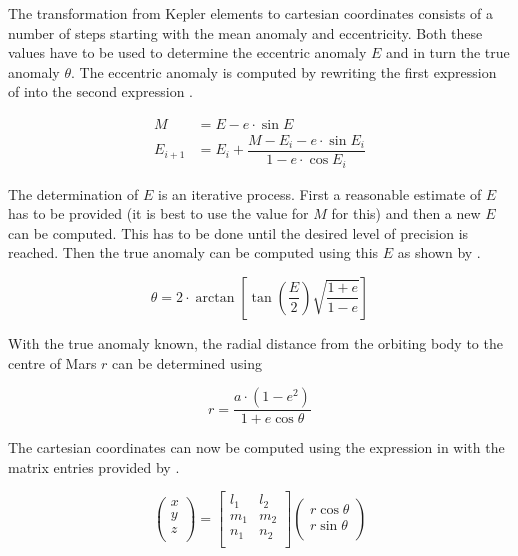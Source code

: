 \noindent
The transformation from Kepler elements to cartesian coordinates consists of a number of steps starting with the mean anomaly and eccentricity. Both these values have to be used to determine the eccentric anomaly $E$ and in turn the true anomaly $\theta$. The eccentric anomaly is computed by rewriting the first expression of  into the second expression \citep{noomen2013basic}. 



\begin{equation}\label{eq:mandecomp}
\begin{split}
 M&=E-e\cdot\sin{E}\\
 E_{i+1}&=E_{i}+\dfrac{M-E_{i}-e\cdot\sin{E_{i}}}{1-e\cdot\cos E_{i}}
\end{split}
\end{equation}

\noindent
The determination of $E$ is an iterative process. First a reasonable estimate of $E$ has to be provided (it is best to use the value for $M$ for this) and then a new $E$ can be computed. This has to be done until the desired level of precision is reached. Then the true anomaly can be computed using this $E$ as shown by .

\begin{equation}\label{eq:etothetacomp}
\theta=2\cdot\arctan\left[\tan\left(\dfrac{E}{2}\right)\sqrt{\dfrac{1+e}{1-e}}\right]
\end{equation}

\noindent
With the true anomaly known, the radial distance from the orbiting body to the centre of Mars $r$ can be determined using 

\begin{equation}\label{eq:radiuscomp}
r=\dfrac{a\cdot\left(1-e^{2}\right)}{1+e\cos\theta }
\end{equation}

\noindent
The cartesian coordinates can now be computed using the expression in  with the matrix entries provided by \citep{noomen2013basic}. 

\begin{equation}\label{eq:keptocartmat}
\begin{pmatrix}
x\\
y\\
z\\
\end{pmatrix}=
\begin{bmatrix}
l_{1} & l_{2}\\
m_{1} & m_{2}\\
n_{1} & n_{2}\\
\end{bmatrix}
\begin{pmatrix}
r\cos\theta \\
r\sin\theta \\
\end{pmatrix}
\end{equation}

